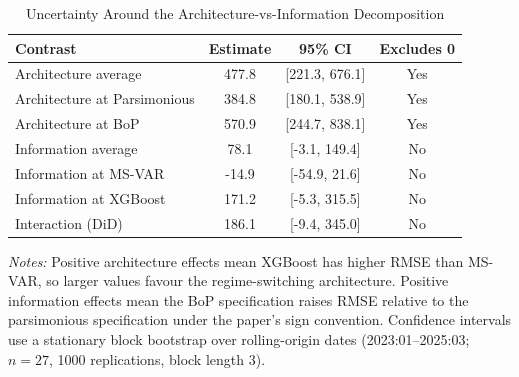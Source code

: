 \begin{table}[htbp]
\centering
\footnotesize
\caption{Uncertainty Around the Architecture-vs-Information Decomposition}
\label{tab:disentangling_uncertainty}
\begin{tabular}{lccc}
\toprule
Contrast & Estimate & 95\% CI & Excludes 0 \\
\midrule
Architecture average & 477.8 & [221.3, 676.1] & Yes \\
Architecture at Parsimonious & 384.8 & [180.1, 538.9] & Yes \\
Architecture at BoP & 570.9 & [244.7, 838.1] & Yes \\
Information average & 78.1 & [-3.1, 149.4] & No \\
Information at MS-VAR & -14.9 & [-54.9, 21.6] & No \\
Information at XGBoost & 171.2 & [-5.3, 315.5] & No \\
Interaction (DiD) & 186.1 & [-9.4, 345.0] & No \\
\bottomrule
\end{tabular}
\begin{tablenotes}
\footnotesize
\item \textit{Notes:} Positive architecture effects mean XGBoost has higher RMSE than MS-VAR, so larger values favour the regime-switching architecture. Positive information effects mean the BoP specification raises RMSE relative to the parsimonious specification under the paper's sign convention. Confidence intervals use a stationary block bootstrap over rolling-origin dates (2023:01--2025:03; $n=27$, 1000 replications, block length 3).
\end{tablenotes}
\end{table}

